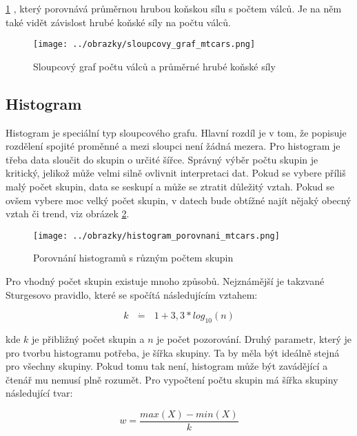 \ref{fig:sloupcovy_graf_mtcars}
, který porovnává průměrnou hrubou koňskou sílu s počtem válců.
Je na něm také vidět závislost hrubé koňské síly na počtu válců.

\begin{figure}[H]
    \centering
    \texttt{[image: ../obrazky/sloupcovy\_graf\_mtcars.png]}
    \caption{Sloupcový graf počtu válců a průměrné hrubé koňské síly} 
    \label{fig:sloupcovy_graf_mtcars}
\end{figure}

\subsection{Histogram}

Histogram je speciální typ sloupcového grafu. Hlavní rozdíl je v tom, že popisuje rozdělení spojité proměnné a mezi sloupci není žádná mezera.
Pro histogram je třeba data sloučit do skupin o určité šířce. Správný výběr počtu skupin je kritický, jelikož může velmi
silně ovlivnit interpretaci dat. Pokud se vybere příliš malý počet skupin, data se seskupí a může se ztratit důležitý vztah. Pokud se ovšem
vybere moc velký počet skupin, v datech bude obtížné najít nějaký obecný vztah či trend,
viz obrázek \ref{fig:histogram_porovnani_mtcars}.

\begin{figure}[H]
    \centering
    \texttt{[image: ../obrazky/histogram\_porovnani\_mtcars.png]}
    \caption{Porovnání histogramů s různým počtem skupin} 
    \label{fig:histogram_porovnani_mtcars}
\end{figure}

Pro vhodný počet skupin existuje mnoho způsobů. Nejznámější je takzvané Sturgesovo pravidlo, které se spočítá následujícím vztahem:

\begin{equation}
    \label{eq:sturgesovo_pravidlo}
    k \text{ } \dot{\mathbf{=}} \text{ } 1 + 3,3 * log_{10}(n)
\end{equation}

kde $k$ je přibližný počet skupin a $n$ je počet pozorování. Druhý parametr, který je pro tvorbu histogramu potřeba, je šířka skupiny.
Ta by měla být ideálně stejná pro všechny skupiny. Pokud tomu tak není, histogram může být zavádějící a čtenář mu nemusí plně rozumět.
Pro vypočtení počtu skupin má šířka skupiny následující tvar:

\begin{equation}
    w = \frac{max(X) - min(X)}{k}
\end{equation}


